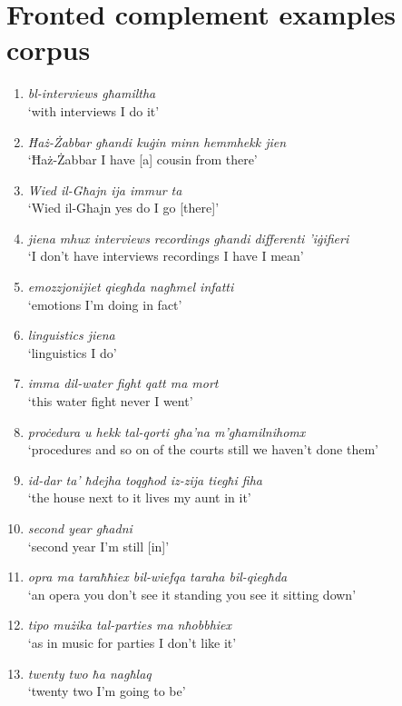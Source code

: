 \documentclass[output=paper]{LSP/langsci}
\begin{document}
\section*{Fronted complement examples corpus}

\begin{enumerate}
\item {\em bl-interviews għamiltha}\\
`with interviews I do it' 
\item {\em  Ħaż-Żabbar     għandi     kuġin     minn hemmhekk     jien}\\
`Ħaż-Żabbar I have [a] cousin from there' 
\item {\em  Wied il-Għajn ija immur ta}\\
`Wied il-Għajn  yes do I go [there]' 
\item {\em  jiena mhux interviews recordings għandi differenti 'iġifieri }\\
`I don't have interviews recordings I have I mean' 
\item {\em  emozzjonijiet     qiegħda     nagħmel     infatti}\\
`emotions I'm doing in fact' 
\item {\em  linguistics  jiena}\\
`linguistics I do' 
\item {\em  imma dil-water fight  qatt ma mort}\\
`this water fight never I went' 
\item {\em  proċedura     u     hekk     tal-qorti     għa'na     m'għamilnihomx}\\
`procedures and so on of the courts still we haven’t done them' 
\item {\em  id-dar     ta'     ħdejha     toqgħod     iz-zija     tiegħi     fiha  }\\
`the house next to it lives my aunt in it' 
\item {\em  second year għadni}\\
`second year I'm still [in]' 
\item {\em  opra ma taraħħiex bil-wiefqa taraha bil-qiegħda}\\
`an opera you don't see it standing you see it sitting down'
\item {\em  tipo mużika tal-parties ma nħobbhiex}\\
`as in  music  for parties I don’t like it' 
\item {\em  twenty two ħa nagħlaq}\\
`twenty two I'm going to be' 

\end{enumerate}
\end{document}
